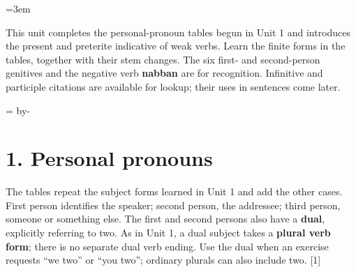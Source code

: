 \newcommand{\runningtitle}{Unit 2. Pronouns and weak verbs}

\emergencystretch=3em
\newcommand{\itempara}[2]{\par\addvspace{3pt}\noindent\hangindent=1.8em\hangafter=1\makebox[1.8em][l]{#1.}#2\par}
\newcommand{\reserve}[1]{\par\begingroup\dimen0=\pagegoal\advance\dimen0 by-\pagetotal\ifdim\dimen0<#1\newpage\fi\endgroup}

\raggedright
{}

This unit completes the personal-pronoun tables begun in Unit 1 and introduces the present and preterite indicative of weak verbs. Learn the finite forms in the tables, together with their stem changes. The six first- and second-person genitives and the negative verb \textbf{nabban} are for recognition. Infinitive and participle citations are available for lookup; their uses in sentences come later.

\reserve{7\baselineskip}
\section*{1. Personal pronouns}

The tables repeat the subject forms learned in Unit 1 and add the other cases. First person identifies the speaker; second person, the addressee; third person, someone or something else. The first and second persons also have a \textbf{dual}, explicitly referring to two. As in Unit 1, a dual subject takes a \textbf{plural verb form}; there is no separate dual verb ending. Use the dual when an exercise requests “we two” or “you two”; ordinary plurals can also include two. [1]

